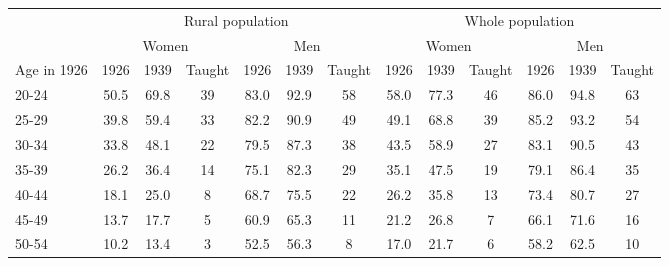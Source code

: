 \begin{tabular}{lcccccccccccc}
\toprule
 & \multicolumn{6}{c}{Rural population} & \multicolumn{6}{c}{Whole population} \\
\cmidrule(lr){2-7}\cmidrule(lr){8-13}
 & \multicolumn{3}{c}{Women} & \multicolumn{3}{c}{Men} & \multicolumn{3}{c}{Women} & \multicolumn{3}{c}{Men} \\
\cmidrule(lr){2-4}\cmidrule(lr){5-7}\cmidrule(lr){8-10}\cmidrule(lr){11-13}
Age in 1926 & 1926 & 1939 & Taught & 1926 & 1939 & Taught & 1926 & 1939 & Taught & 1926 & 1939 & Taught \\
\midrule
20-24 & 50.5 & 69.8 & 39 & 83.0 & 92.9 & 58 & 58.0 & 77.3 & 46 & 86.0 & 94.8 & 63 \\
25-29 & 39.8 & 59.4 & 33 & 82.2 & 90.9 & 49 & 49.1 & 68.8 & 39 & 85.2 & 93.2 & 54 \\
30-34 & 33.8 & 48.1 & 22 & 79.5 & 87.3 & 38 & 43.5 & 58.9 & 27 & 83.1 & 90.5 & 43 \\
35-39 & 26.2 & 36.4 & 14 & 75.1 & 82.3 & 29 & 35.1 & 47.5 & 19 & 79.1 & 86.4 & 35 \\
40-44 & 18.1 & 25.0 & 8 & 68.7 & 75.5 & 22 & 26.2 & 35.8 & 13 & 73.4 & 80.7 & 27 \\
45-49 & 13.7 & 17.7 & 5 & 60.9 & 65.3 & 11 & 21.2 & 26.8 & 7 & 66.1 & 71.6 & 16 \\
50-54 & 10.2 & 13.4 & 3 & 52.5 & 56.3 & 8 & 17.0 & 21.7 & 6 & 58.2 & 62.5 & 10 \\
\bottomrule
\end{tabular}
